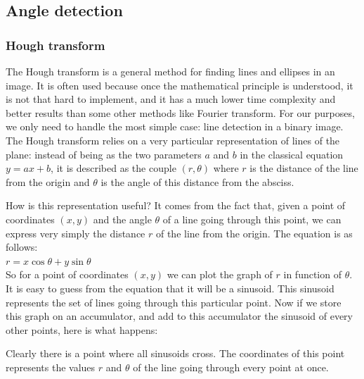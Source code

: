 \subsection{Angle detection}

\subsubsection{Hough transform}

The Hough transform is a general method for finding lines and ellipses in an
image. It is often used because once the mathematical principle is understood,
it is not that hard to implement, and it has a much lower time complexity and
better results than some other methods like Fourier transform. For our purposes,
we only need to handle the most simple case: line detection in a binary image.\\

The Hough transform relies on a very particular representation of lines of the
plane: instead of being as the two parameters $a$ and $b$ in the classical
equation $y = ax + b$, it is described as the couple $(r, \theta)$ where $r$ is
the distance of the line from the origin and $\theta$ is the angle of this
distance from the absciss.\\

\begin{center}
\end{center}

How is this representation useful? It comes from the fact that, given a point
of coordinates $(x, y)$ and the angle $\theta$ of a line going through this
point, we can express very simply the distance $r$ of the line from the origin.
The equation is as follows:\\

$r = x\cos\theta + y\sin\theta$\\

So for a point of coordinates $(x, y)$ we can plot the graph of $r$ in function
of $\theta$. It is easy to guess from the equation that it will be a sinusoid.
This sinusoid represents the set of lines going through this particular point.
Now if we store this graph on an accumulator, and add to this accumulator the
sinusoid of every other points, here is what happens:\\

\begin{center}
\end{center}

Clearly there is a point where all sinusoids cross. The coordinates of this
point represents the values $r$ and $\theta$ of the line going through every
point at once.

